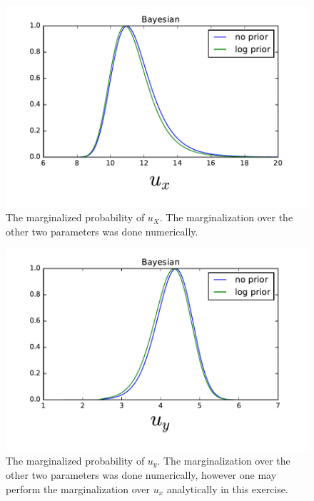 \documentclass[12pt,a4paper]{article}
\begin{document}
\begin{figure}[ht]
  \centering
  \includegraphics[keepaspectratio]{ux_bayesian.pdf}
  \caption{The marginalized probability of $u_X$. The marginalization
    over the other two parameters was done numerically.}
  \label{fig:ux_bayesian}
\end{figure}

\begin{figure}[ht]
  \centering
  \includegraphics[keepaspectratio]{uy_bayesian.pdf}
  \caption{The marginalized probability of $u_y$. The marginalization
    over the other two parameters was done numerically, however
    one may perform the marginalization over $u_x$ analytically in
    this exercise.}
  \label{fig:uy_bayesian}
\end{figure}
\end{document}

